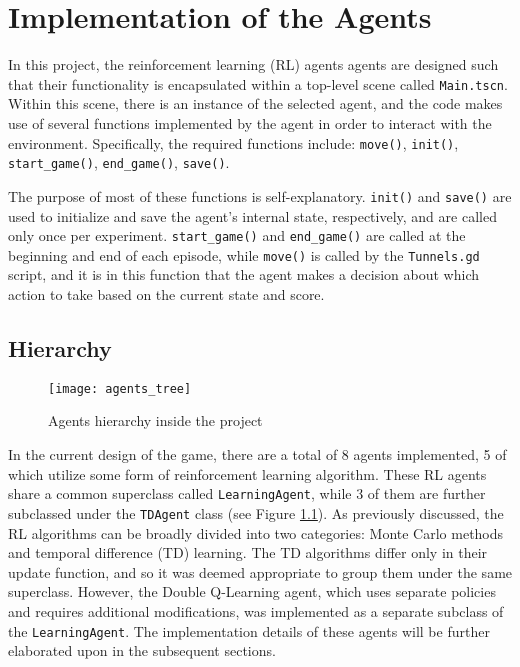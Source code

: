 \chapter{Implementation of the Agents}
\label{implOfAgents}
In this project, the reinforcement learning (RL) agents agents are designed such that their functionality is encapsulated within a top-level scene called \texttt{Main.tscn}. Within this scene, there is an instance of the selected agent, and the code makes use of several functions implemented by the agent in order to interact with the environment. Specifically, the required functions include: \texttt{move()}, \texttt{init()}, \texttt{start\_game()}, \texttt{end\_game()}, \texttt{save()}.

The purpose of most of these functions is self-explanatory. \texttt{init()} and \texttt{save()} are used to initialize and save the agent's internal state, respectively, and are called only once per experiment. \texttt{start\_game()} and \texttt{end\_game()} are called at the beginning and end of each episode, while \texttt{move()} is called by the \texttt{Tunnels.gd} script, and it is in this function that the agent makes a decision about which action to take based on the current state and score.

\section{Hierarchy}
\begin{figure}[h]
    \centering
    \texttt{[image: agents\_tree]}
    \caption{Agents hierarchy inside the project}
    \label{fig:agents_tree}
\end{figure}

In the current design of the game, there are a total of 8 agents implemented, 5 of which utilize some form of reinforcement learning algorithm. These RL agents share a common superclass called \texttt{LearningAgent}, while 3 of them are further subclassed under the \texttt{TDAgent} class (see Figure \ref{fig:agents_tree}). As previously discussed, the RL algorithms can be broadly divided into two categories: Monte Carlo methods and temporal difference (TD) learning. The TD algorithms differ only in their update function, and so it was deemed appropriate to group them under the same superclass. However, the Double Q-Learning agent, which uses separate policies and requires additional modifications, was implemented as a separate subclass of the \texttt{LearningAgent}. The implementation details of these agents will be further elaborated upon in the subsequent sections. 

